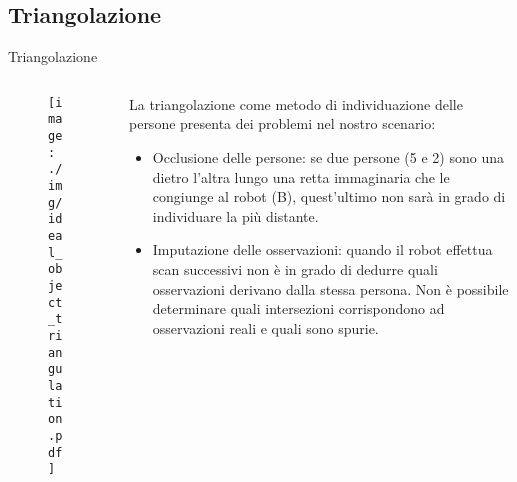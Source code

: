\documentclass[aspectratio=169, leqno]{beamer}
\begin{document}
	\subsection{Triangolazione}\label{subsec:Triangolazione}
	\begin{frame}{Triangolazione}
		\begin{columns}
			\begin{column}{0.3\textwidth}
				\begin{figure}[htpb]
					\centering
					\texttt{[image: ./img/ideal\_object\_triangulation.pdf]}
					\label{fig:triangulation}
				\end{figure}
			\end{column}

			\begin{column}{0.7\textwidth}
				\justifying
				La triangolazione come metodo di individuazione delle persone
				presenta dei problemi nel nostro scenario:
				\begin{itemize}
					\justifying
					\pause\item Occlusione delle persone: se due persone
						(5 e 2) sono una dietro l'altra lungo una retta
						immaginaria che le congiunge al robot (B), quest'ultimo
						non sarà in grado di individuare la più distante. 

					\pause\item Imputazione delle osservazioni: quando il robot
						effettua scan successivi non è in grado di dedurre
						quali osservazioni derivano dalla stessa persona.
						Non è possibile determinare quali intersezioni
						corrispondono ad osservazioni reali e quali sono spurie. 

				\end{itemize}
			\end{column}
		\end{columns}
	\end{frame}
	
\end{document}
